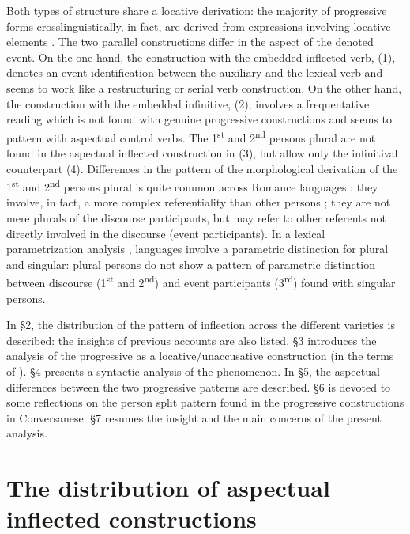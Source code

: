 \documentclass[output=paper]{langsci/langscibook}
\begin{document}
Both types of structure share a locative derivation: the majority of progressive forms crosslinguistically, in fact, are derived from expressions involving locative elements  \citep{BybeePerkinsPagliuca1994,Mateu1999,Laka2006}. The two parallel constructions differ in the aspect of the denoted event. On the one hand, the construction with the embedded inflected verb, (1), denotes an event identification between the auxiliary and the lexical verb and seems to work like a restructuring or serial verb construction. On the other hand, the construction with the embedded infinitive, (2), involves a frequentative reading which is not found with genuine progressive constructions \citep{Chierchia1995} and seems to pattern with aspectual control verbs. The 1\textsuperscript{st} and 2\textsuperscript{nd} persons plural are not found in the aspectual inflected construction in (3), but allow only the infinitival counterpart (4). Differences in the pattern of the morphological derivation of the 1\textsuperscript{st} and 2\textsuperscript{nd} persons plural is quite common across Romance languages \citep{Manzini2005,Manzini2011Bio}: they involve, in fact, a more complex referentiality than other persons \citep{Bobaljik2008Missing}; they are not mere plurals of the discourse participants, but may refer to other referents not directly involved in the discourse (event participants). In a lexical parametrization analysis \citep{Manzini2011Bio}, languages involve a parametric distinction for plural and singular: plural persons do not show a pattern of parametric distinction between discourse (1\textsuperscript{st} and 2\textsuperscript{nd}) and event participants (3\textsuperscript{rd}) found with singular persons. 

In §2, the distribution of the pattern of inflection across the different varieties is described: the insights of previous accounts are also listed. §3 introduces the analysis of the progressive as a locative/unaccusative construction (in the terms of \citealt{Mateu1999}). §4 presents a syntactic analysis of the phenomenon. In §5, the aspectual differences between the two progressive patterns are described. §6 is devoted to some reflections on the person split pattern found in the progressive constructions in Conversanese. §7 resumes the insight and the main concerns of the present analysis. 

\section{The distribution of aspectual inflected constructions}%
\end{document}
